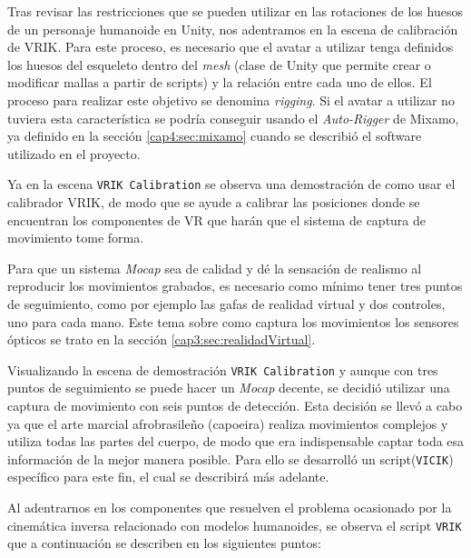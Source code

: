 Tras revisar las restricciones que se pueden utilizar en las rotaciones de los huesos de un personaje humanoide en Unity, nos adentramos en la escena de calibración de VRIK. Para este proceso, es necesario que el avatar a utilizar tenga definidos los huesos del esqueleto dentro del \textit{mesh} (clase de Unity que permite crear o modificar mallas a partir de scripts) y la relación entre cada uno de ellos. El proceso para realizar este objetivo se denomina \textit{rigging}. Si el avatar a utilizar no tuviera esta característica se podría conseguir usando el \textit{Auto-Rigger} de Mixamo, ya definido en la sección \ref{cap4:sec:mixamo}  cuando se describió el software utilizado en el proyecto.

Ya en la escena \texttt{VRIK Calibration} se observa una demostración de como usar el calibrador VRIK, de modo que se ayude a calibrar las posiciones donde se encuentran los componentes de VR que harán que el sistema de captura de movimiento tome forma.

Para que un sistema \textit{Mocap} sea de calidad y dé la sensación de realismo al reproducir los movimientos grabados, es necesario como mínimo tener tres puntos de seguimiento, como por ejemplo las gafas de realidad virtual y dos controles, uno para cada mano. Este tema sobre como captura los movimientos los sensores ópticos se trato en la sección \ref{cap3:sec:realidadVirtual}.

Visualizando la escena de demostración \texttt{VRIK Calibration} y aunque con tres puntos de seguimiento se puede hacer un \textit{Mocap} decente, se decidió utilizar una captura de movimiento con seis puntos de detección. Esta decisión se llevó a cabo ya que el arte marcial afrobrasileño (capoeira) realiza movimientos complejos y utiliza todas las partes del cuerpo, de modo que era indispensable captar toda esa información de la mejor manera posible. 
Para ello se desarrolló un script(\texttt{VICIK}) específico para este fin, el cual se describirá más adelante.

Al adentrarnos en los componentes que resuelven el problema ocasionado por la cinemática inversa relacionado con modelos humanoides, se observa el script \texttt{VRIK} que a continuación se describen en los siguientes puntos:

